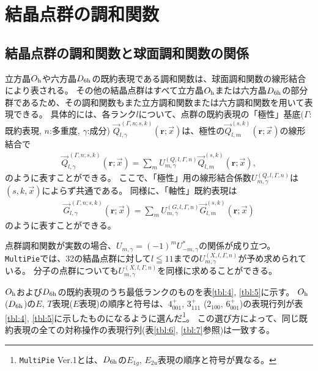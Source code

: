 \documentclass[11pt]{easymemo}
\begin{document}
\section{結晶点群の調和関数}

\subsection{結晶点群の調和関数と球面調和関数の関係}

立方晶$O_{\rm h}$や六方晶$D_{\rm 6h}$の既約表現である調和関数は、球面調和関数の線形結合により表される。
その他の結晶点群はすべて立方晶$O_{\rm h}$または六方晶$D_{\rm 6h}$の部分群であるため、その調和関数もまた立方調和関数または六方調和関数を用いて表現できる。
具体的には、各ランク$l$について、点群の既約表現の「極性」基底$(\Gamma$:既約表現, $n$:多重度, $\gamma$:成分) $\vec{Q}_{l,\gamma}^{\,(\Gamma,n;s,k)}(\bm{r};\vec{x})$は、極性の$\vec{Q}_{l,m}^{(s,k)}(\bm{r};\vec{x})$の線形結合で
\begin{align}
\vec{Q}_{l,\gamma}^{\,(\Gamma,n;s,k)}(\bm{r};\vec{x})=\sum_m U_{m,\gamma}^{(Q,l,\Gamma,n)} \vec{Q}_{l,m}^{(s,k)}(\bm{r};\vec{x}),
\label{eq:mullinear}
\end{align}
のように表すことができる。
ここで、「極性」用の線形結合係数$U_{m,\gamma}^{(Q,l,\Gamma,n)}$は$(s,k,\vec{x})$によらず共通である。
同様に、「軸性」既約表現は
\begin{align}
\vec{G}_{l,\gamma}^{\,(\Gamma,n;s,k)}(\bm{r};\vec{x})=\sum_m U_{m,\gamma}^{(G,l,\Gamma,n)} \vec{G}_{l,m}^{(s,k)}(\bm{r};\vec{x})
\end{align}
のように表すことができる。

点群調和関数が実数の場合、$U_{m,\gamma}=(-1)^m U_{-m,\gamma}^*$の関係が成り立つ。
\texttt{MultiPie}では、32の結晶点群に対して$l\leqq 11$までの$U_{m,\gamma}^{(X,l,\Gamma,n)}$が予め求められている。
分子の点群についても$U_{m,\gamma}^{(X,l,\Gamma,n)}$を同様に求めることができる。

$O_{\rm h}$および$D_{\rm 6h}$の既約表現のうち最低ランクのものを表\ref{tbl:4}, \ref{tbl:5}に示す。
$O_{\rm h}$ ($D_{\rm 6h}$)の$E$, $T$表現($E$表現)の順序と符号は、$4_{001}^{+}$, $3_{111}^{+}$ ($2_{100}$, $6_{001}^{+}$)の表現行列が表\ref{tbl:4}, \ref{tbl:5}に示したものになるように選んだ\footnote{{\tt MultiPie} Ver.1とは、$D_{\rm 6h}$の$E_{1g}$, $E_{2u}$表現の順序と符号が異なる。}。
この選び方によって、同じ既約表現の全ての対称操作の表現行列(表\ref{tbl:6}, \ref{tbl:7}参照)は一致する。
\end{document}

